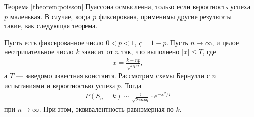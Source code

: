 \documentclass[../main.tex]{subfiles}
\begin{document}
Теорема \ref{theorem:poisson} Пуассона осмысленна, только если вероятность успеха $p$ маленькая. В случае, когда $ p $ фиксирована, применимы другие результаты такие, как следующая теорема.
\begin{thm}
 \label{theorem:local_theorem_muavr_laplas}
 Пусть есть фиксированное число $0 < p < 1$, $q = 1 - p$. Пусть $n \to \infty$, и целое неотрицательное число $ k $ зависит от $ n $ так, что выполнено $ \left| x \right| \leqslant T $, где
 \begin{align*}
  x =\frac{k - np}{\sqrt{npq}},
 \end{align*} а $ T $ --- заведомо известная константа. Рассмотрим схемы Бернулли с $n$ испытаниями и вероятностью успеха $p$. Тогда
 \begin{align*}
  P(S_n = k) \sim \frac{1}{\sqrt{2\pi npq }}\cdot e^{-x^{2} / 2}
 \end{align*} при $n \to \infty$. При этом, эквивалентность равномерная по $ k $.
\end{thm}
\end{document}
